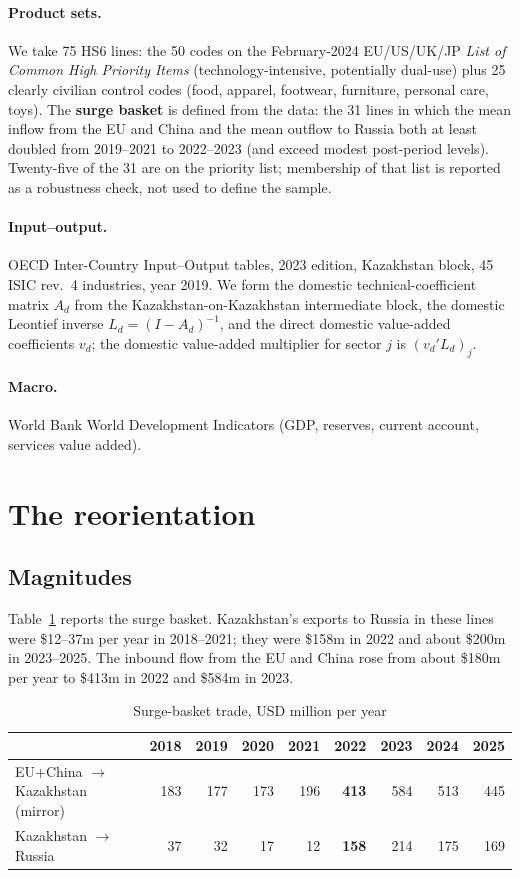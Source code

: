 \documentclass[12pt]{article}
\begin{document}
\paragraph{Product sets.} We take 75 HS6 lines: the 50 codes on the February-2024 EU/US/UK/JP
\emph{List of Common High Priority Items} (technology-intensive, potentially dual-use) plus 25
clearly civilian control codes (food, apparel, footwear, furniture, personal care, toys). The
\textbf{surge basket} is defined from the data: the 31 lines in which the mean inflow from the
EU and China and the mean outflow to Russia both at least doubled from 2019--2021 to
2022--2023 (and exceed modest post-period levels). Twenty-five of the 31 are on the priority
list; membership of that list is reported as a robustness check, not used to define the
sample.

\paragraph{Input--output.} OECD Inter-Country Input--Output tables, 2023 edition, Kazakhstan
block, 45 ISIC rev.~4 industries, year 2019. We form the domestic technical-coefficient matrix
$A_d$ from the Kazakhstan-on-Kazakhstan intermediate block, the domestic Leontief inverse
$L_d = (I-A_d)^{-1}$, and the direct domestic value-added coefficients $v_d$; the
domestic value-added multiplier for sector $j$ is $(v_d' L_d)_j$.

\paragraph{Macro.} World Bank World Development Indicators (GDP, reserves, current account,
services value added).

\section{The reorientation}

\subsection{Magnitudes}

Table~\ref{tab:magnitudes} reports the surge basket. Kazakhstan's exports to Russia in these
lines were \$12--37m per year in 2018--2021; they were \$158m in 2022 and about \$200m in
2023--2025. The inbound flow from the EU and China rose from about \$180m per year to \$413m
in 2022 and \$584m in 2023.

\begin{table}[t]
\centering
\caption{Surge-basket trade, USD million per year}
\label{tab:magnitudes}
\begin{tabular}{lrrrrrrrr}
\toprule
 & 2018 & 2019 & 2020 & 2021 & \textbf{2022} & 2023 & 2024 & 2025 \\
\midrule
EU+China $\to$ Kazakhstan (mirror) & 183 & 177 & 173 & 196 & \textbf{413} & 584 & 513 & 445 \\
Kazakhstan $\to$ Russia            &  37 &  32 &  17 &  12 & \textbf{158} & 214 & 175 & 169 \\
\bottomrule
\end{tabular}
\end{table}
\end{document}
